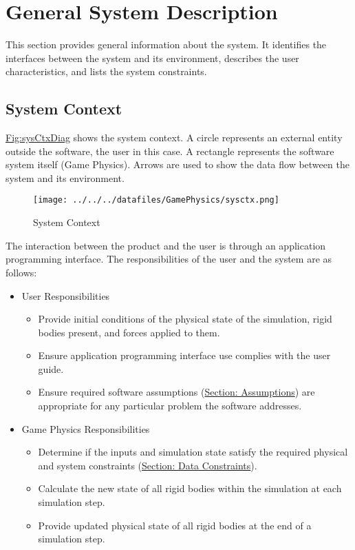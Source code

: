 \documentclass[12pt]{article}
\begin{document}
\section{General System Description}
\label{Sec:GenSysDesc}
This section provides general information about the system. It identifies the interfaces between the system and its environment, describes the user characteristics, and lists the system constraints.

\subsection{System Context}
\label{Sec:SysContext}
\hyperref[Figure:sysCtxDiag]{Fig:sysCtxDiag} shows the system context. A circle represents an external entity outside the software, the user in this case. A rectangle represents the software system itself (Game Physics). Arrows are used to show the data flow between the system and its environment.

\begin{figure}
\begin{center}
\texttt{[image: ../../../datafiles/GamePhysics/sysctx.png]}
\caption{System Context}
\label{Figure:sysCtxDiag}
\end{center}
\end{figure}
The interaction between the product and the user is through an application programming interface. The responsibilities of the user and the system are as follows:

\begin{itemize}
\item{User Responsibilities}
\begin{itemize}
\item{Provide initial conditions of the physical state of the simulation, rigid bodies present, and forces applied to them.}
\item{Ensure application programming interface use complies with the user guide.}
\item{Ensure required software assumptions (\hyperref[Sec:Assumps]{Section: Assumptions}) are appropriate for any particular problem the software addresses.}
\end{itemize}
\item{Game Physics Responsibilities}
\begin{itemize}
\item{Determine if the inputs and simulation state satisfy the required physical and system constraints (\hyperref[Sec:DataConstraints]{Section: Data Constraints}).}
\item{Calculate the new state of all rigid bodies within the simulation at each simulation step.}
\item{Provide updated physical state of all rigid bodies at the end of a simulation step.}
\end{itemize}
\end{itemize}
\end{document}
